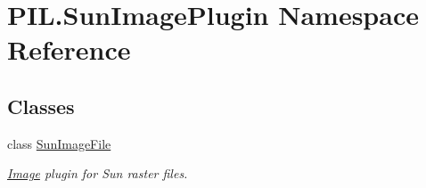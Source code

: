 \hypertarget{namespacePIL_1_1SunImagePlugin}{}\section{P\+I\+L.\+Sun\+Image\+Plugin Namespace Reference}
\label{namespacePIL_1_1SunImagePlugin}
\subsection*{Classes}
\begin{DoxyCompactItemize}
\item 
class \hyperlink{classPIL_1_1SunImagePlugin_1_1SunImageFile}{Sun\+Image\+File}
\begin{DoxyCompactList}\small\item\em \hyperlink{namespacePIL_1_1Image}{Image} plugin for Sun raster files. \end{DoxyCompactList}\end{DoxyCompactItemize}
